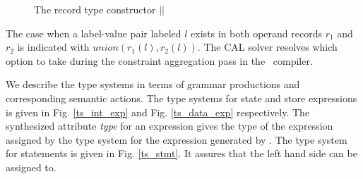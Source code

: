 \begin{figure}[h!]
\noindent{}
\caption{The record type constructor $||$\label{rec_construc}}
\end{figure}

The case when a label-value pair labeled $l$ exists in both operand records $r_1$ and $r_2$ is indicated with $union(r_1(l),r_2(l))$. The CAL solver resolves which option to take during the constraint aggregation pass in the \ak\ compiler.

We describe the type systems in terms of grammar productions and corresponding semantic actions. The type systems for state and store expressions is given in Fig. \ref{ts_int_exp} and Fig. \ref{ts_data_exp} respectively. The synthesized attribute \emph{type} for an expression  gives the type of the expression assigned by the type system for the expression generated by . The type system for statements is given in Fig. \ref{ts_stmt}. It assures that the left hand side can be assigned to.


